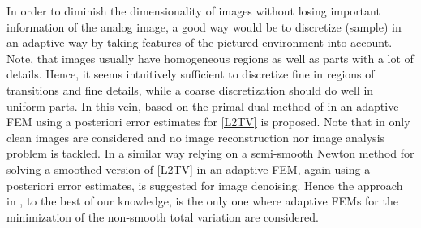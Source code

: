 \documentclass[enabledeprecatedfontcommands,cleardoublepage=empty,headsepline,twoside,11pt,DIV=15,BCOR=12mm,final]{scrartcl}
\begin{document}

In order to diminish the dimensionality of images without losing important information of the analog image, a good way would be to discretize (sample) in an adaptive way by taking features of the pictured environment into account. Note, that images usually have homogeneous regions as well as parts with a lot of details. Hence, it seems intuitively sufficient to discretize fine in regions of transitions and fine details, while a coarse discretization should do well in uniform parts. In this vein, based on the primal-dual method of \cite{ChaPoc} in \cite{Bar2015} an adaptive FEM using a posteriori error estimates for \eqref{L2TV} is proposed.  %
Note that in \cite{Bar2015} only clean images are considered and no image reconstruction nor image analysis problem is tackled. In a similar way relying on a semi-smooth Newton method for solving a smoothed version of \eqref{L2TV} in \cite{HinRin2014} an adaptive FEM, again using a posteriori error estimates, is suggested for image denoising. Hence the approach in \cite{Bar2015}, to the best of our knowledge, is the only one where adaptive FEMs for the minimization of the non-smooth total variation are considered. %
\end{document}
